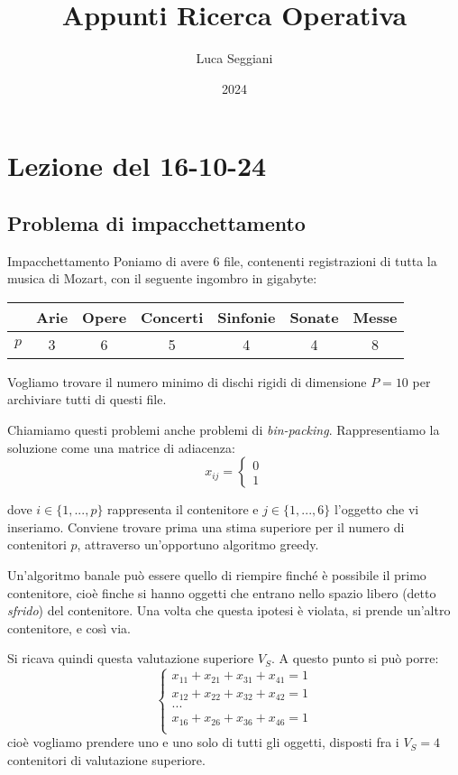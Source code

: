 \documentclass[a4paper,11pt]{article}
\title{Appunti Ricerca Operativa}
\author{Luca Seggiani}
\date{2024}
\begin{document}
\section{Lezione del 16-10-24}

\thispagestyle{empty}
\pagestyle{fancy}

\subsection{Problema di impacchettamento}
\begin{problem}{Impacchettamento}
	Poniamo di avere 6 file, contenenti registrazioni di tutta la musica di Mozart, con il seguente ingombro in gigabyte:

	\center {}
	\begin{tabular} { | c || c | c | c | c | c | c | }
		\hline 
		& \bfseries Arie & \bfseries Opere & \bfseries Concerti & \bfseries Sinfonie & \bfseries Sonate & \bfseries Messe \\
		\hline
		$p$ & 3 & 6 & 5 & 4 & 4 & 8 \\
		\hline
	\end{tabular}
	
	\par\bigskip

	\raggedright
	Vogliamo trovare il numero minimo di dischi rigidi di dimensione $P = 10$ per archiviare tutti di questi file.

\end{problem}

Chiamiamo questi problemi anche problemi di \textit{bin-packing}.
Rappresentiamo la soluzione come una matrice di adiacenza:
$$
x_{ij} =	
	\begin{cases}
			0 \\ 1
	\end{cases}
$$

dove $i \in \{ 1, ..., p \}$ rappresenta il contenitore e $j \in \{1, ..., 6\}$ l'oggetto che vi inseriamo.
Conviene trovare prima una stima superiore per il numero di contenitori $p$, attraverso un'opportuno algoritmo greedy.

Un'algoritmo banale può essere quello di riempire finché è possibile il primo contenitore, cioè finche si hanno oggetti che entrano nello spazio libero (detto \textit{sfrido}) del contenitore.
Una volta che questa ipotesi è violata, si prende un'altro contenitore, e così via.

Si ricava quindi questa valutazione superiore $V_S$.
A questo punto si può porre:
\[
	\begin{cases}
		x_{11} + x_{21} + x_{31} + x_{41} = 1 \\	
		x_{12} + x_{22} + x_{32} + x_{42} = 1 \\	
		... \\ 
		x_{16} + x_{26} + x_{36} + x_{46} = 1 \\	
	\end{cases}
\]
cioè vogliamo prendere uno e uno solo di tutti gli oggetti, disposti fra i $V_S = 4$ contenitori di valutazione superiore.
\end{document}
